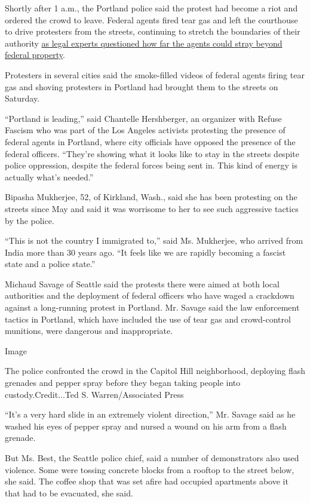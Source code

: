 Shortly after 1 a.m., the Portland police said the protest had become a
riot and ordered the crowd to leave. Federal agents fired tear gas and
left the courthouse to drive protesters from the streets, continuing to
stretch the boundaries of their authority
\href{https://www.nytimes3xbfgragh.onion/2020/07/25/us/portland-federal-legal-jurisdiction-courts.html}{as
legal experts questioned how far the agents could stray beyond federal
property}.

Protesters in several cities said the smoke-filled videos of federal
agents firing tear gas and shoving protesters in Portland had brought
them to the streets on Saturday.

``Portland is leading,'' said Chantelle Hershberger, an organizer with
Refuse Fascism who was part of the Los Angeles activists protesting the
presence of federal agents in Portland, where city officials have
opposed the presence of the federal officers. ``They're showing what it
looks like to stay in the streets despite police oppression, despite the
federal forces being sent in. This kind of energy is actually what's
needed.''

Bipasha Mukherjee, 52, of Kirkland, Wash., said she has been protesting
on the streets since May and said it was worrisome to her to see such
aggressive tactics by the police.

``This is not the country I immigrated to,'' said Ms. Mukherjee, who
arrived from India more than 30 years ago. ``It feels like we are
rapidly becoming a fascist state and a police state.''

Michaud Savage of Seattle said the protests there were aimed at both
local authorities and the deployment of federal officers who have waged
a crackdown against a long-running protest in Portland. Mr. Savage said
the law enforcement tactics in Portland, which have included the use of
tear gas and crowd-control munitions, were dangerous and inappropriate.

Image

The police confronted the crowd in the Capitol Hill neighborhood,
deploying flash grenades and pepper spray before they began taking
people into custody.Credit...Ted S. Warren/Associated Press

``It's a very hard slide in an extremely violent direction,'' Mr. Savage
said as he washed his eyes of pepper spray and nursed a wound on his arm
from a flash grenade.

But Ms. Best, the Seattle police chief, said a number of demonstrators
also used violence. Some were tossing concrete blocks from a rooftop to
the street below, she said. The coffee shop that was set afire had
occupied apartments above it that had to be evacuated, she said.

